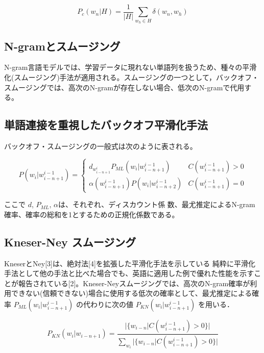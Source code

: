 \begin{equation}
		P_c(w_n|H) = \frac{1}{|H|} \sum_{w_h \in H} \delta (w_n, w_h)
    \label{cache}
\end{equation}

\subsection{N-gramとスムージング}

N-gram言語モデルでは、学習データに現れない単語列を扱うため、種々の平滑化(スムージング)手法が適用される。スムージングの一つとして，バックオフ・スムージングでは、高次のN-gramが存在しない場合、低次のN-gramで代用する。

\subsection{単語連接を重視したバックオフ平滑化手法}
バックオフ・スムージングの一般式は次のように表される。

\begin{equation}
		P(w_i|w_{i-n+1}^{i-1}) = 
    \begin{cases} 
        d_{w_{i-n+1}^i} P_{ML}(w_i|w_{i-n+1}^{i-1}) & C(w_{i-n+1}^{i-1}) > 0\\ 
        \alpha(w_{i-n+1}^{i-1})P(w_i|w_{i-n+2}^{i-1}) & C(w_{i-n+1}^{i-1}) = 0
    \end{cases} 
    \label{ngram_smoosing1}
\end{equation}

ここで $d$, $P_{ML}$, $\alpha$は、それぞれ、ディスカウント係
数、最尤推定によるN-gram確率、確率の総和を1とするための正規化係数である。

\subsection{Kneser-Ney スムージング}
KneserとNey[3]は、絶対法[4]を拡張した平滑化手法を示している
純粋に平滑化手法として他の手法と比べた場合でも、英語に適用した例で優れた性能を示すことが報告されている[2]。Kneser-Neyスムージングでは、高次のN-gram確率が利用できない(信頼できない)場合に使用する低次の確率として、最尤推定による確率 $P_{ML} (w_i|w_{i-n+1}^{i-1})$ の代わりに次の値 $P_{KN} (w_i|w_{i-n+1}^{i-1})$ を用いる．

\begin{equation}
		P_{KN} (w_i|w_{i-n+1}) = \frac{|\{w_{i-n}|C(w_{i-n+1}^{i-1}) > 0\}|}{\sum_{w_i} |\{w_{i-n}|C(w_{i-n+1}^{i-1}) > 0\}|} 
    \label{ngram_smoosing2}
\end{equation}


